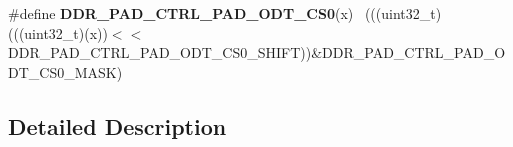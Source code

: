 \begin{DoxyCompactItemize}
\item 
\hypertarget{group___d_d_r___register___masks_ga132d837ce412c784b83b101f18cf5c7f}{}\#define {\bfseries D\+D\+R\+\_\+\+P\+A\+D\+\_\+\+C\+T\+R\+L\+\_\+\+P\+A\+D\+\_\+\+O\+D\+T\+\_\+\+C\+S0}(x)                        ~(((uint32\+\_\+t)(((uint32\+\_\+t)(x))$<$$<$D\+D\+R\+\_\+\+P\+A\+D\+\_\+\+C\+T\+R\+L\+\_\+\+P\+A\+D\+\_\+\+O\+D\+T\+\_\+\+C\+S0\+\_\+\+S\+H\+I\+F\+T))\&D\+D\+R\+\_\+\+P\+A\+D\+\_\+\+C\+T\+R\+L\+\_\+\+P\+A\+D\+\_\+\+O\+D\+T\+\_\+\+C\+S0\+\_\+\+M\+A\+S\+K)\label{group___d_d_r___register___masks_ga132d837ce412c784b83b101f18cf5c7f}

\end{DoxyCompactItemize}


\subsection{Detailed Description}
